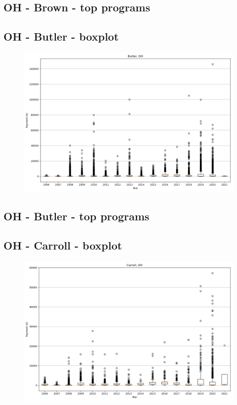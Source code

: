 \subsection*{OH - Brown - top programs}

\newpage
\subsection*{OH - Butler - boxplot}
\begin{figure}[h]
\centering
\includegraphics[width=7in]{../output/boxplots/counties/Butler-OH_boxplot.png}
\end{figure}


\subsection*{OH - Butler - top programs}

\newpage
\subsection*{OH - Carroll - boxplot}
\begin{figure}[h]
\centering
\includegraphics[width=7in]{../output/boxplots/counties/Carroll-OH_boxplot.png}
\end{figure}


